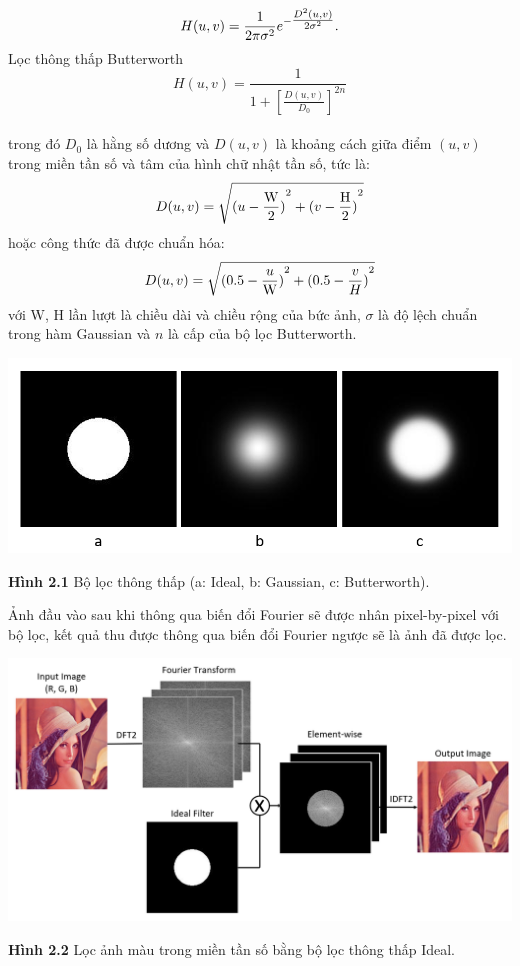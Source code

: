 $$H(u,v) = \frac{1}{{2\pi {\sigma ^2}}}{e^{ - {\textstyle{{{D^2}(u,v)} \over {2{\sigma ^2}}}}}}.$$
Lọc thông thấp Butterworth
$$H(u,v) = \frac{1}{{1 + {{\left[ {\frac{{D(u,v)}}{{{D_0}}}} \right]}^{2n}}}}$$
\\
trong đó $D_0$ là hằng số dương và $D(u,v)$ là khoảng cách giữa điểm $(u,v)$ trong miền tần số và tâm của hình chữ nhật tần số, tức là:
$$D(u,v) = \sqrt {{{(u - \frac{{\rm{W}}}{2})}^2} + {{(v - \frac{{\rm{H}}}{2})}^2}} $$
hoặc công thức đã được chuẩn hóa:
$$D(u,v) = \sqrt {{{(0.5 - \frac{u}{{\rm{W}}})}^2} + {{(0.5 - \frac{v}{H})}^2}} $$
với W, H lần lượt là chiều dài và chiều rộng của bức ảnh, $\sigma$ là độ lệch chuẩn trong hàm Gaussian và $n$ là cấp của bộ lọc Butterworth.
\begin{center}
    \includegraphics[scale=0.55]{Figures/fig6.png}
    \par \textbf {Hình 2.1} Bộ lọc thông thấp (a: Ideal, b: Gaussian, c: Butterworth).
\end{center}
\par Ảnh đầu vào sau khi thông qua biến đổi Fourier sẽ được nhân pixel-by-pixel với bộ lọc, kết quả thu được thông qua biến đổi Fourier ngược sẽ là ảnh đã được lọc.
\begin{center}
    \includegraphics[scale=0.45]{Figures/fig1.png}
    \par \textbf {Hình 2.2} Lọc ảnh màu trong miền tần số bằng bộ lọc thông thấp Ideal.
\end{center}

